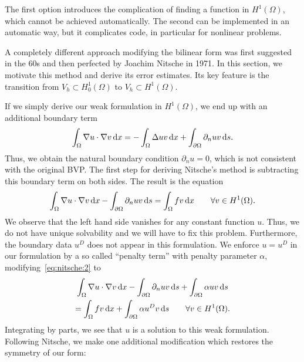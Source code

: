 \begin{intro}
The first option introduces the complication of finding a function in
$H^1(\Omega)$, which cannot be achieved automatically. The second can
be implemented in an automatic way, but it complicates code, in
particular for nonlinear problems.

A completely different approach modifying the bilinear form was first
suggested in the 60s and then perfected by Joachim Nitsche in 1971. In
this section, we motivate this method and derive its error
estimates. Its key feature is the transition from
$V_h \subset H^1_0(\Omega)$ to $V_h \subset H^1(\Omega)$.
\end{intro}

\begin{intro}
  If we simply derive our weak formulation in $H^1(\Omega)$, we end up
  with an additional boundary term
  \begin{gather}
    \int_\Omega \nabla u \cdot \nabla v \,\mathrm{d} x
    =
    - \int_\Omega \Delta u v \,\mathrm{d} x
    + \int_{\partial\Omega} \partial_n u v \,\mathrm{d} s.
  \end{gather}
  Thus, we obtain the natural boundary condition $\partial_n u=0$,
  which is not consistent with the original BVP. The first step for
  deriving Nitsche's method is subtracting this boundary term on both
  sides. The result is the equation
  \begin{gather}
    \label{eq:nitsche:2}
    \int_\Omega \nabla u \cdot \nabla v \,\mathrm{d} x
    -\int_{\partial\Omega} \partial_n u v \,\mathrm{d} s
    = \int_\Omega fv\,\mathrm{d} x
    \qquad\forall v\in H^1(\Omega).
  \end{gather}
  We observe that the left hand side vanishes for any constant
  function $u$. Thus, we do not have unique solvability and we will
  have to fix this problem. Furthermore, the boundary data $u^D$ does
  not appear in this formulation. We enforce $u=u^D$ in our
  formulation by a so called ``penalty term'' with penalty parameter
  $\alpha$, modifying~\eqref{eq:nitsche:2} to
  \begin{multline}
    \label{eq:nitsche:3}
    \int_\Omega \nabla u \cdot \nabla v \,\mathrm{d} x
    -\int_{\partial\Omega} \partial_n u v \,\mathrm{d} s
    + \int_{\partial\Omega} \alpha u v \,\mathrm{d} s
    \\
    = \int_\Omega fv\,\mathrm{d} x
    + \int_{\partial\Omega} \alpha u^D v \,\mathrm{d} s
    \qquad\forall v\in H^1(\Omega).
  \end{multline}
  Integrating by parts, we see that $u$ is a solution to this weak
  formulation. Following Nitsche, we make one additional modification
  which restores the symmetry of our form:
  \begin{multline}

\end{multline}
\end{intro}

